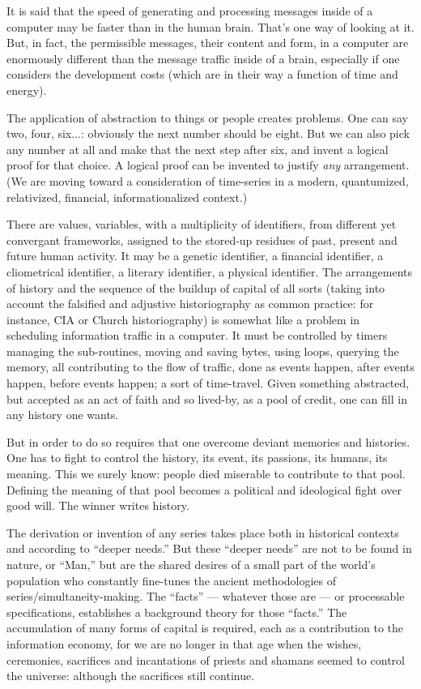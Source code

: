 It is said that the speed of generating and
processing messages inside of a computer
may be faster than in the human brain. That's
one way of looking at it. But, in fact, the
permissible messages, their content and
form, in a computer are enormously different than the message traffic inside of a
brain, especially if one considers the development costs (which are in their way a
function of time and energy).

The application of abstraction to things or
people creates problems. One can say two,
four, six...: obviously the next number
should be eight. But we can also pick any
number at all and make that the next step
after six, and invent a logical proof for that
choice. A logical proof can be invented to
justify \emph{any} arrangement. (We are moving
toward a consideration of time-series in a
modern, quantumized, relativized, financial,
informationalized context.)

There are values, variables, with a multiplicity of identifiers, from different yet convergant frameworks, assigned to the stored-up residues of past, present and future human activity. It may be a genetic identifier, a
financial identifier, a cliometrical identifier,
a literary identifier, a physical identifier.
The arrangements of history and the sequence
of the buildup of capital of all sorts (taking
into account the falsified and adjustive historiography as common practice: for instance,
CIA or Church historiography) is somewhat
like a problem in scheduling information
traffic in a computer. It must be controlled by
timers managing the sub-routines, moving
and saving bytes, using loops, querying the
memory, all contributing to the flow of traffic,
done as events happen, after events happen,
before events happen; a sort of time-travel.
Given something abstracted, but accepted as
an act of faith and so lived-by, as a pool of
credit, one can fill in any history one wants.

But in order to do so requires that one
overcome deviant memories and histories.
One has to fight to control the history, its
event, its passions, its humans, its meaning.
This we surely know: people died miserable
to contribute to that pool. Defining the
meaning of that pool becomes a political and
ideological fight over good will. The winner
writes history.

The derivation or invention of any series
takes place both in historical contexts and
according to \enquote{deeper needs.} But these
\enquote{deeper needs} are not to be found in nature,
or \enquote{Man,} but are the shared desires of a
small part of the world's population who
constantly fine-tunes the ancient methodologies of series\slash simultaneity-making. The
\enquote{facts} --- whatever those are --- or processable
specifications, establishes a background
theory for those \enquote{facts.} The accumulation
of many forms of capital is required, each as
a contribution to the information economy,
for we are no longer in that age when the
wishes, ceremonies, sacrifices and incantations of priests and shamans seemed to control the universe: although the sacrifices still continue.

